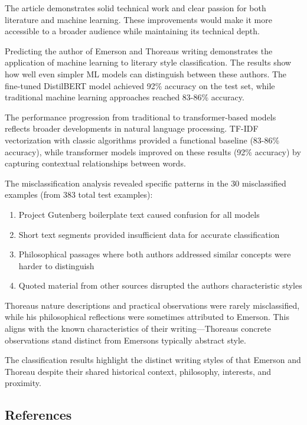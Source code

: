 \documentclass[
]{article}
\begin{document}
The article demonstrates solid technical work and clear passion for both
literature and machine learning. These improvements would make it more
accessible to a broader audience while maintaining its technical depth.

Predicting the author of Emerson and Thoreau\textquotesingle s writing
demonstrates the application of machine learning to literary style
classification. The results show how well even simpler ML models can
distinguish between these authors. The fine-tuned DistilBERT model
achieved 92\% accuracy on the test set, while traditional machine
learning approaches reached 83-86\% accuracy.

The performance progression from traditional to transformer-based models
reflects broader developments in natural language processing. TF-IDF
vectorization with classic algorithms provided a functional baseline
(83-86\% accuracy), while transformer models improved on these results
(92\% accuracy) by capturing contextual relationships between words.

The misclassification analysis revealed specific patterns in the 30
misclassified examples (from 383 total test examples):

\begin{enumerate}
\def\labelenumi{\arabic{enumi}.}
\item
  Project Gutenberg boilerplate text caused confusion for all models
\item
  Short text segments provided insufficient data for accurate
  classification
\item
  Philosophical passages where both authors addressed similar concepts
  were harder to distinguish
\item
  Quoted material from other sources disrupted the
  authors\textquotesingle{} characteristic styles
\end{enumerate}

Thoreau\textquotesingle s nature descriptions and practical observations
were rarely misclassified, while his philosophical reflections were
sometimes attributed to Emerson. This aligns with the known
characteristics of their writing---Thoreau\textquotesingle s concrete
observations stand distinct from Emerson\textquotesingle s typically
abstract style.

The classification results highlight the distinct writing styles of that
Emerson and Thoreau despite their shared historical context, philosophy,
interests, and proximity.

\subsection{References}\label{references}
\end{document}
